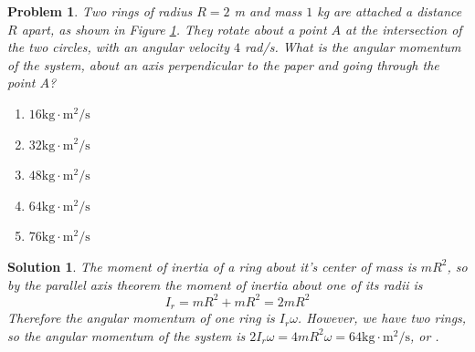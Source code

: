 \documentclass[12pt]{article}
\newcommand{\clearpts}{\addtocounter{tpts}{\value{cpts}} \setcounter{cpts}{0}}
\newcommand{\pts}[1]{\clearpts \setcounter{cpts}{#1}}
\newtheorem*{solution}{Solution}
\theoremstyle{mystyle}
\newtheorem{pproblem}{Problem}
\begin{document}
\pts{2}
\begin{pproblem}
    Two \textit{rings} of radius $R=2$ m and mass $1$ kg are attached a distance $R$ apart, as shown in Figure \ref{two-circles}. They rotate about a point $A$ at the intersection
    of the two circles, with an angular velocity $4$ rad/s.
    What is the angular momentum of the system, about an axis perpendicular to the
    paper and going through the point $A$?

    \begin{figure}[H]
        \centering
        \label{two-circles}
    \end{figure}
    \begin{enumerate}[(\Alph*)]
        \item $16\mathrm{kg\cdot m^2/s}$
        \item $32\mathrm{kg\cdot m^2/s}$
        \item $48\mathrm{kg\cdot m^2/s}$
        \item $64\mathrm{kg\cdot m^2/s}$
        \item $76\mathrm{kg\cdot m^2/s}$
    \end{enumerate}
\end{pproblem}
\begin{solution}
    The moment of inertia of a ring about it's center of mass is $mR^2$, so by
    the parallel axis theorem the moment of inertia about one of its radii is \[
        I_r=mR^2+mR^2=2mR^2
    \]
    Therefore the angular momentum of one ring is $I_r\omega$. However, we have two
    rings, so the angular momentum of the system is $2I_r\omega=4mR^2\omega=64\mathrm{kg\cdot m^2/s}$, or .
\end{solution}
\end{document}
